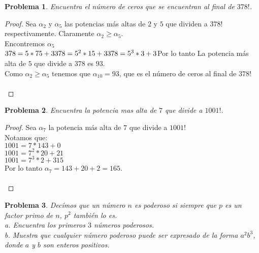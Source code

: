 \documentclass[12pt,oneside]{article}
\newtheorem{prob}{Problema}
\begin{document}
\begin{prob} %
Encuentra el n\'umero de ceros que se encuentran al final de $378!$.
\end{prob}

\begin{proof}
Sea $\alpha_2$ y $\alpha_5$ las potencias m\'as altas de $2$ y $5$ que dividen a $378!$ respectivamente. Claramente $\alpha_2 \geq \alpha_5$.\\
Encontremos $\alpha_5$\\
$
378 = 5*75 + 3\\
378 = 5^2*15 + 3\\
378 = 5^3*3 + 3\\
$Por lo tanto La potencia m\'as alta de $5$ que divide a $378$ es $93$.\\
Como $\alpha_2 \geq \alpha_5$ tenemos que $\alpha_{10} = 93$, que es el n\'umero de ceros al final de $378!$\\\\
\end{proof}


\begin{prob} %
Encuentra la potencia mas alta de $7$ que divide a $1001!$.
\end{prob}


\begin{proof}
Sea $\alpha_7$ la potencia m\'as alta de $7$ que divide a $1001!$\\
Notamos que:\\
$1001 = 7*143 + 0$\\
$1001 = 7^2*20 + 21$\\
$1001 = 7^3*2 + 315$\\
Por lo tanto $\alpha_7 = 143 + 20 + 2 = 165$.\\\\
\end{proof}


\begin{prob} %
Dec\'imos que un n\'umero $n$ es poderoso si siempre que $p$ es un factor primo de $n$, $p^2$ tambi\'en lo es.\\
a. Encuentra los primeros $3$ n\'umeros poderosos.\\
b. Muestra que cualquier n\'umero poderoso puede ser expresado de la forma $a^2b^3$, donde $a$ y $b$ son enteros positivos.
\end{prob}
\end{document}
